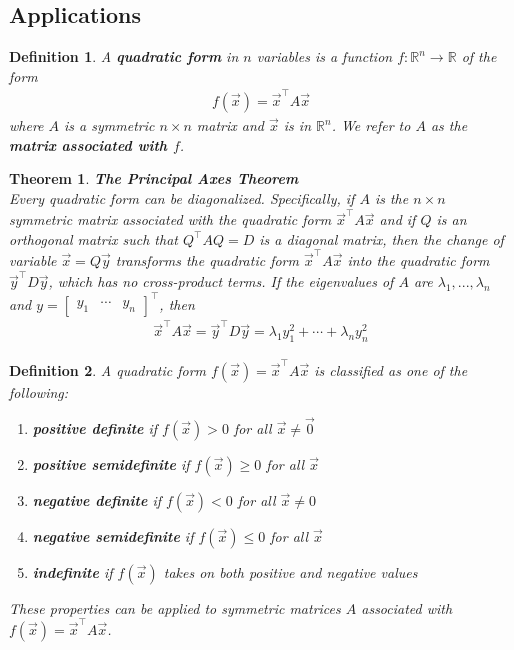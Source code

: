 \documentclass{article}
\theoremstyle{sltheorem}
\newtheorem{definition}{Definition}[section]
\newtheorem{theorem}{Theorem}[section]
\begin{document}
\subsection{Applications}
\begin{definition}
    A \textbf{quadratic form} in $n$ variables is a function $f:\mathbb{R}^n\to\mathbb{R}$ of the form
    \begin{align*}
        f(\vec x) = \vec x^\intercal A\vec x
    \end{align*}
    where $A$ is a symmetric $n\times n$ matrix and $\vec x$ is in $\mathbb{R}^n$. We refer to $A$ as the \textbf{matrix associated with $f$}.
\end{definition}
\begin{theorem}
    \textbf{The Principal Axes Theorem}\\
    Every quadratic form can be diagonalized. Specifically, if $A$ is the $n\times n$ symmetric matrix associated with the quadratic form $\vec x^\intercal A\vec x$ and if $Q$ is an orthogonal matrix such that $Q^\intercal AQ=D$ is a diagonal matrix, then the change of variable $\vec x = Q\vec y$ transforms the quadratic form $\vec x^\intercal A\vec x$ into the quadratic form $\vec y^\intercal D\vec y$, which has no cross-product terms.
    If the eigenvalues of $A$ are $\lambda_1, ...,\lambda_n$ and $y=\begin{bmatrix}
        y_1 &\cdots &y_n
    \end{bmatrix}^\intercal $, then
    \begin{align*}
        \vec x^\intercal A\vec x = \vec y^\intercal D\vec y = \lambda_1 y_1^2+\cdots+\lambda_n y_n^2
    \end{align*}
\end{theorem}
\begin{definition}
    A quadratic form $f(\vec x) = \vec x^\intercal A\vec x$ is classified as one of the following:
    \begin{enumerate}
        \item \textbf{positive definite} if $f(\vec x)>0$ for all $\vec x \not= \vec 0$
        \item \textbf{positive semidefinite} if $f(\vec x)\geq 0$ for all $\vec x$
        \item \textbf{negative definite} if $f(\vec x)<0$ for all $\vec x \not= 0$
        \item \textbf{negative semidefinite} if $f(\vec x)\leq 0$ for all $\vec x$
        \item \textbf{indefinite} if $f(\vec x)$ takes on both positive and negative values
    \end{enumerate}
    These properties can be applied to symmetric matrices $A$ associated with $f(\vec x)=\vec x^\intercal A\vec x$.
\end{definition}
\end{document}
